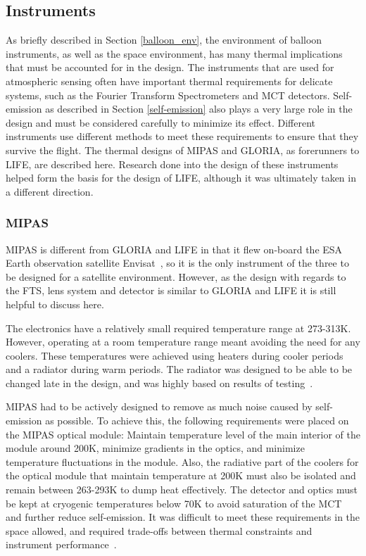 \subsection{Instruments} \label{GLORIA_MIPAS_thermal}
As briefly described in Section \ref{balloon_env}, the environment of balloon instruments, as well as the space environment, has many thermal implications that must be accounted for in the design. The instruments that are used for atmospheric sensing often have important thermal requirements for delicate systems, such as the Fourier Transform Spectrometers and MCT detectors. Self-emission as described in Section \ref{self-emission} also plays a very large role in the design and must be considered carefully to minimize its effect. Different instruments use different methods to meet these requirements to ensure that they survive the flight. The thermal designs of MIPAS and GLORIA, as forerunners to LIFE, are described here. Research done into the design of these instruments helped form the basis for the design of LIFE, although it was ultimately taken in a different direction.

\subsubsection{MIPAS}
MIPAS is different from GLORIA and LIFE in that it flew on-board the ESA Earth observation satellite Envisat~\citep{MIPAS_thermal}, so it is the only instrument of the three to be designed for a satellite environment. However, as the design with regards to the FTS, lens system and detector is similar to GLORIA and LIFE it is still helpful to discuss here.

The electronics have a relatively small required temperature range at 273-313K. However, operating at a room temperature range meant avoiding the need for any coolers. These temperatures were achieved using heaters during cooler periods and a radiator during warm periods. The radiator was designed to be able to be changed late in the design, and was highly based on results of testing~\citep{MIPAS_thermal}.

MIPAS had to be actively designed to remove as much noise caused by self-emission as possible. To achieve this, the following requirements were placed on the MIPAS optical module: Maintain temperature level of the main interior of the module around 200K, minimize gradients in the optics, and minimize temperature fluctuations in the module. Also, the radiative part of the coolers for the optical module that maintain temperature at 200K must also be isolated and remain between 263-293K to dump heat effectively. The detector and optics must be kept at cryogenic temperatures below 70K to avoid saturation of the MCT and further reduce self-emission. It was difficult to meet these requirements in the space allowed, and required trade-offs between thermal constraints and instrument performance~\citep{MIPAS_thermal}. 

